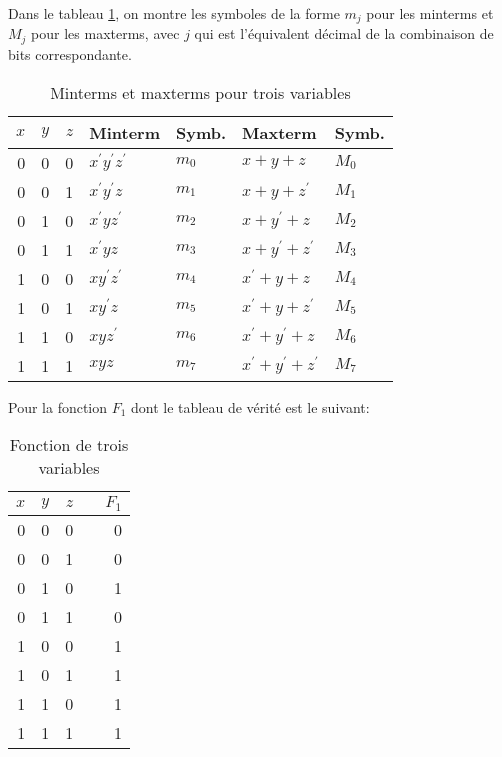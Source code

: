 \documentclass[11pt]{article}
\begin{document}
Dans le tableau \ref{tab:org582cf67}, on montre les symboles de la forme
\(m_j\) pour les minterms et \(M_j\) pour les maxterms, avec \(j\) qui
est l'équivalent décimal de la combinaison de bits correspondante.

\begin{table}[htbp]
\caption{\label{tab:org582cf67}Minterms et maxterms pour trois variables}
\centering
\begin{tabular}{rrrllll}
\(x\) & \(y\) & \(z\) & Minterm & Symb. & Maxterm & Symb.\\[0pt]
\hline
0 & 0 & 0 & \(x^\prime y^\prime z^\prime\) & \(m_0\) & \(x+ y+ z\) & \(M_0\)\\[0pt]
0 & 0 & 1 & \(x^\prime y^\prime z\) & \(m_1\) & \(x+ y+ z^\prime\) & \(M_1\)\\[0pt]
0 & 1 & 0 & \(x^\prime y z^\prime\) & \(m_2\) & \(x+ y^\prime+ z\) & \(M_2\)\\[0pt]
0 & 1 & 1 & \(x^\prime y z\) & \(m_3\) & \(x+ y^\prime+ z^\prime\) & \(M_3\)\\[0pt]
1 & 0 & 0 & \(x y^\prime z^\prime\) & \(m_4\) & \(x^\prime+ y+ z\) & \(M_4\)\\[0pt]
1 & 0 & 1 & \(x y^\prime z\) & \(m_5\) & \(x^\prime+ y+ z^\prime\) & \(M_5\)\\[0pt]
1 & 1 & 0 & \(x y z^\prime\) & \(m_6\) & \(x^\prime+ y^\prime+ z\) & \(M_6\)\\[0pt]
1 & 1 & 1 & \(x y z\) & \(m_7\) & \(x^\prime + y^\prime+ z^\prime\) & \(M_7\)\\[0pt]
\end{tabular}
\end{table}

Pour la fonction \(F_1\) dont le tableau de vérité est le suivant: 

\begin{table}[htbp]
\caption{\label{tab:org492c7ef}Fonction de trois variables}
\centering
\begin{tabular}{rrrlr}
\(x\) & \(y\) & \(z\) &  & \(F_1\)\\[0pt]
\hline
0 & 0 & 0 &  & 0\\[0pt]
0 & 0 & 1 &  & 0\\[0pt]
0 & 1 & 0 &  & 1\\[0pt]
0 & 1 & 1 &  & 0\\[0pt]
1 & 0 & 0 &  & 1\\[0pt]
1 & 0 & 1 &  & 1\\[0pt]
1 & 1 & 0 &  & 1\\[0pt]
1 & 1 & 1 &  & 1\\[0pt]
\end{tabular}
\end{table}
\end{document}
